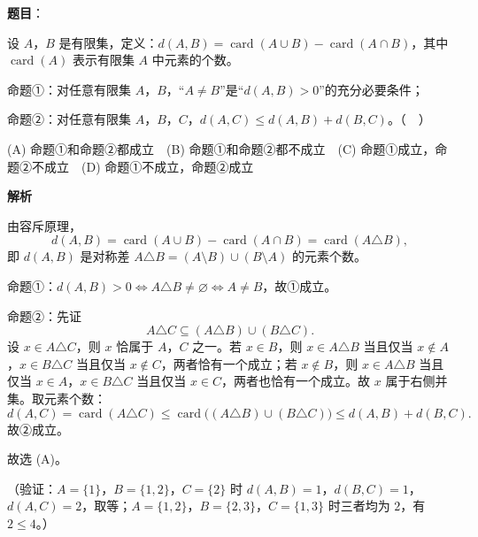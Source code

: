 \begin{answer}

\textbf{题目}：

设 \(A\)，\(B\) 是有限集，定义：\(d(A,B)=\operatorname{card}(A\cup B)-\operatorname{card}(A\cap B)\)，其中 \(\operatorname{card}(A)\) 表示有限集 \(A\) 中元素的个数。

命题①：对任意有限集 \(A\)，\(B\)，“\(A\neq B\)”是“\(d(A,B)>0\)”的充分必要条件；

命题②：对任意有限集 \(A\)，\(B\)，\(C\)，\(d(A,C)\leqslant d(A,B)+d(B,C)\)。（　）

(A) 命题①和命题②都成立　(B) 命题①和命题②都不成立　(C) 命题①成立，命题②不成立　(D) 命题①不成立，命题②成立

\textbf{解析}

由容斥原理，
\nopagebreak[4]
\[
d(A,B)=\operatorname{card}(A\cup B)-\operatorname{card}(A\cap B)
=\operatorname{card}(A\triangle B),
\]
即 \(d(A,B)\) 是对称差 \(A\triangle B=(A\setminus B)\cup(B\setminus A)\) 的元素个数。

命题①：\(d(A,B)>0\iff A\triangle B\neq\varnothing\iff A\neq B\)，故①成立。

命题②：先证
\nopagebreak[4]
\[
A\triangle C\subseteq(A\triangle B)\cup(B\triangle C).
\]
设 \(x\in A\triangle C\)，则 \(x\) 恰属于 \(A\)，\(C\) 之一。若 \(x\in B\)，则 \(x\in A\triangle B\) 当且仅当 \(x\notin A\)，\(x\in B\triangle C\) 当且仅当 \(x\notin C\)，两者恰有一个成立；若 \(x\notin B\)，则 \(x\in A\triangle B\) 当且仅当 \(x\in A\)，\(x\in B\triangle C\) 当且仅当 \(x\in C\)，两者也恰有一个成立。故 \(x\) 属于右侧并集。取元素个数：
\nopagebreak[4]
\[
d(A,C)=\operatorname{card}(A\triangle C)
\leqslant\operatorname{card}\bigl((A\triangle B)\cup(B\triangle C)\bigr)
\leqslant d(A,B)+d(B,C).
\]
故②成立。

故选 (A)。

（验证：\(A=\{1\}\)，\(B=\{1,2\}\)，\(C=\{2\}\) 时 \(d(A,B)=1\)，\(d(B,C)=1\)，\(d(A,C)=2\)，取等；\(A=\{1,2\}\)，\(B=\{2,3\}\)，\(C=\{1,3\}\) 时三者均为 \(2\)，有 \(2\leqslant4\)。）


\end{answer}
